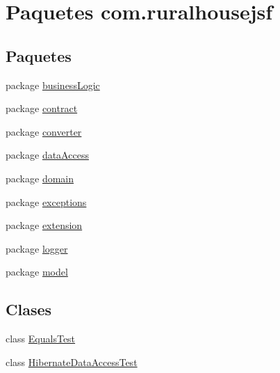 \hypertarget{namespacecom_1_1ruralhousejsf}{}\section{Paquetes com.\+ruralhousejsf}
\label{namespacecom_1_1ruralhousejsf}
\subsection*{Paquetes}
\begin{DoxyCompactItemize}
\item 
package \mbox{\hyperlink{namespacecom_1_1ruralhousejsf_1_1business_logic}{business\+Logic}}
\item 
package \mbox{\hyperlink{namespacecom_1_1ruralhousejsf_1_1contract}{contract}}
\item 
package \mbox{\hyperlink{namespacecom_1_1ruralhousejsf_1_1converter}{converter}}
\item 
package \mbox{\hyperlink{namespacecom_1_1ruralhousejsf_1_1data_access}{data\+Access}}
\item 
package \mbox{\hyperlink{namespacecom_1_1ruralhousejsf_1_1domain}{domain}}
\item 
package \mbox{\hyperlink{namespacecom_1_1ruralhousejsf_1_1exceptions}{exceptions}}
\item 
package \mbox{\hyperlink{namespacecom_1_1ruralhousejsf_1_1extension}{extension}}
\item 
package \mbox{\hyperlink{namespacecom_1_1ruralhousejsf_1_1logger}{logger}}
\item 
package \mbox{\hyperlink{namespacecom_1_1ruralhousejsf_1_1model}{model}}
\end{DoxyCompactItemize}
\subsection*{Clases}
\begin{DoxyCompactItemize}
\item 
class \mbox{\hyperlink{classcom_1_1ruralhousejsf_1_1_equals_test}{Equals\+Test}}
\item 
class \mbox{\hyperlink{classcom_1_1ruralhousejsf_1_1_hibernate_data_access_test}{Hibernate\+Data\+Access\+Test}}
\end{DoxyCompactItemize}
